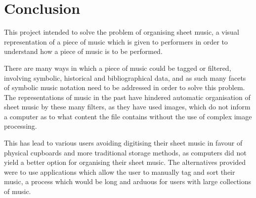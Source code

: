 \section{Conclusion}
This project intended to solve the problem of organising sheet music, a visual representation of a piece of music which is given to performers in order to understand how a piece of music is to be performed.

There are many ways in which a piece of music could be tagged or filtered, involving symbolic, historical and bibliographical data, and as such many facets of symbolic music notation need to be addressed in order to solve this problem. The representations of music in the past have hindered automatic organisation of sheet music by these many filters, as they have used images, which do not inform a computer as to what content the file contains without the use of complex image processing.

This has lead to various users avoiding digitising their sheet music in favour of physical cupboards and more traditional storage methods, as computers did not yield a better option for organising their sheet music. The alternatives provided were to use applications which allow the user to manually tag and sort their music, a process which would be long and arduous for users with large collections of music.